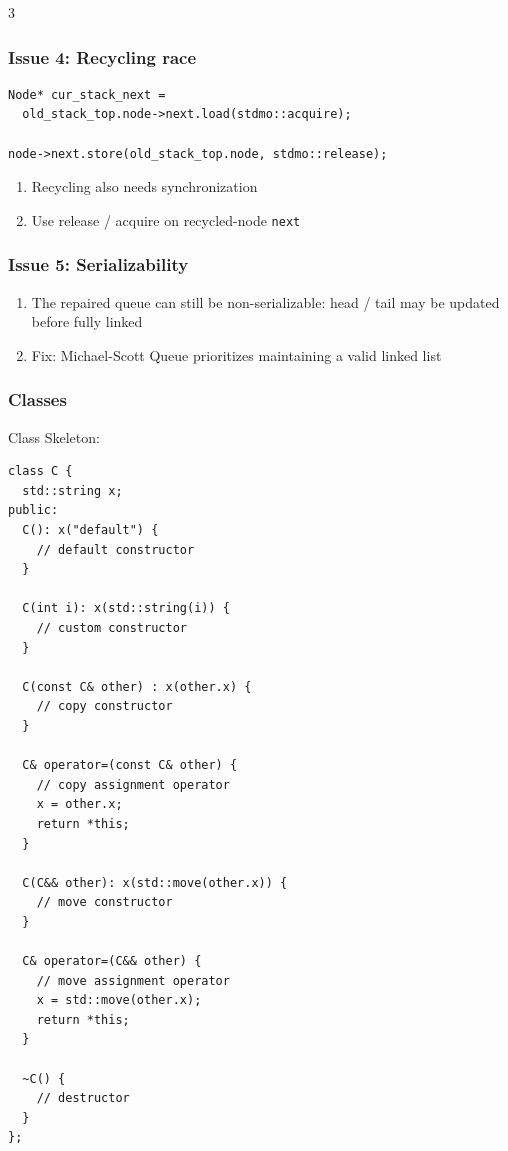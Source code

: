 \documentclass[12pt, a4paper]{article}
\begin{document}
\begin{multicols*}{3}
\subsubsection{Issue 4: Recycling race}
\begin{lstlisting}[basicstyle=\ttfamily\scriptsize]
Node* cur_stack_next =
  old_stack_top.node->next.load(stdmo::acquire);

node->next.store(old_stack_top.node, stdmo::release);
\end{lstlisting}
\begin{enumerate}[$\bullet$]
  \item Recycling also needs synchronization
  \item Use release / acquire on recycled-node \lstinline|next|
\end{enumerate}

\subsubsection{Issue 5: Serializability}
\begin{enumerate}[$\bullet$]
  \item The repaired queue can still be non-serializable: head / tail may be updated before fully linked
  \item Fix: Michael-Scott Queue prioritizes maintaining a valid linked list 
\end{enumerate}

\colbreak
\subsubsection{Classes}

Class Skeleton:
\begin{lstlisting}
class C {
  std::string x;
public:
  C(): x("default") {
    // default constructor
  }

  C(int i): x(std::string(i)) {
    // custom constructor
  }

  C(const C& other) : x(other.x) {
    // copy constructor
  }

  C& operator=(const C& other) {
    // copy assignment operator
    x = other.x;
    return *this;
  }

  C(C&& other): x(std::move(other.x)) {
    // move constructor
  }

  C& operator=(C&& other) {
    // move assignment operator
    x = std::move(other.x);
    return *this;
  }

  ~C() {
    // destructor
  }
};
\end{lstlisting}


\end{multicols*}
\end{document}
